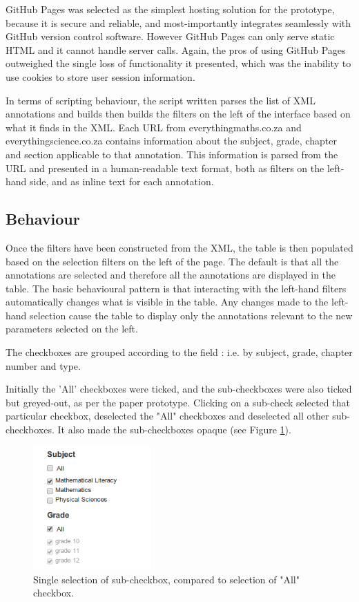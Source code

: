 GitHub Pages was selected as the simplest hosting solution for the prototype, because it is secure and reliable, and most-importantly integrates seamlessly with GitHub version control software. However GitHub Pages can only serve static HTML and it cannot handle server calls. Again, the pros of using GitHub Pages outweighed the single loss of functionality it presented, which was the inability to use cookies to store user session information. 


In terms of scripting behaviour, the script written parses the list of XML annotations and builds then builds the filters on the left of the interface based on what it finds in the XML. Each URL from everythingmaths.co.za and everythingscience.co.za contains information about the subject, grade, chapter and section applicable to that annotation. This information is parsed from the URL and presented in a human-readable text format, both as filters on the left-hand side, and as inline text for each annotation. 

\subsection{Behaviour}
Once the filters have been constructed from the XML, the table is then populated based on  the selection filters on the left of the page. The default is that all the annotations are selected and therefore all the annotations are displayed in the table. The basic behavioural pattern is that interacting with the left-hand filters automatically changes what is visible in the table. Any changes made to the left-hand selection cause the table to display only the annotations relevant to the new parameters selected on the left. 

The checkboxes are grouped according to the field \citep[p. 439]{Galitz}: i.e. by subject, grade, chapter number and type. 

Initially the 'All' checkboxes were ticked, and the sub-checkboxes were also ticked but greyed-out, as per the paper prototype. Clicking on a sub-check selected that particular checkbox, deselected the "All" checkboxes and deselected all other sub-checkboxes. It also made the sub-checkboxes opaque (see Figure \ref{fig:checkboxes1}). 

\begin{figure}[h!]
    \centering
    \includegraphics[width=0.4\textwidth]{Figures/V1/checkboxes.png}
 \caption{Single selection of sub-checkbox, compared to selection of "All" checkbox.}
 \label{fig:checkboxes1}
\end{figure}

